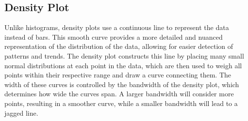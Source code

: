 \documentclass[
  letterpaper,
]{book}
\begin{document}
\hypertarget{density-plot}{%
\subsection{Density Plot}\label{density-plot}}

Unlike histograms, density plots use a continuous line to represent the
data instead of bars. This smooth curve provides a more detailed and
nuanced representation of the distribution of the data, allowing for
easier detection of patterns and trends. The density plot constructs
this line by placing many small normal distributions at each point in
the data, which are then used to weigh all points within their
respective range and draw a curve connecting them. The width of these
curves is controlled by the bandwidth of the density plot, which
determines how wide the curves span. A larger bandwidth will consider
more points, resulting in a smoother curve, while a smaller bandwidth
will lead to a jagged line.
\end{document}

